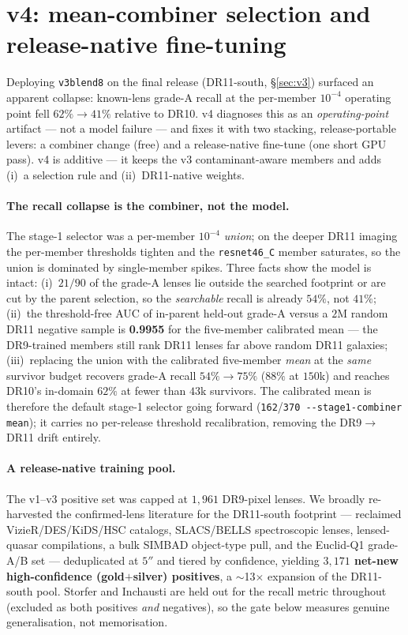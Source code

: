 \section{\cnet{} v4: mean-combiner selection and release-native fine-tuning}
\label{sec:v4}
Deploying \texttt{v3blend8} on the final release (DR11-south, \S\ref{sec:v3}) surfaced an apparent
collapse: known-lens grade-A recall at the per-member $10^{-4}$ operating point fell $62\%\!\to\!41\%$
relative to DR10. v4 diagnoses this as an \emph{operating-point} artifact --- not a model failure ---
and fixes it with two stacking, release-portable levers: a combiner change (free) and a release-native
fine-tune (one short GPU pass). v4 is additive --- it keeps the v3 contaminant-aware members and adds
(i)~a selection rule and (ii)~DR11-native weights.

\paragraph{The recall collapse is the combiner, not the model.} The stage-1 selector was a per-member
$10^{-4}$ \emph{union}; on the deeper DR11 imaging the per-member thresholds tighten and the
\texttt{resnet46\_C} member saturates, so the union is dominated by single-member spikes. Three facts
show the model is intact: (i)~$21/90$ of the grade-A lenses lie outside the searched footprint or are
cut by the parent selection, so the \emph{searchable} recall is already $54\%$, not $41\%$;
(ii)~the threshold-free AUC of in-parent held-out grade-A versus a $2$M random DR11 negative sample is
\textbf{0.9955} for the five-member calibrated mean --- the DR9-trained members still rank DR11 lenses
far above random DR11 galaxies; (iii)~replacing the union with the calibrated five-member \emph{mean}
at the \emph{same} survivor budget recovers grade-A recall $54\%\!\to\!75\%$ ($88\%$ at $150$k) and
reaches DR10's in-domain $62\%$ at fewer than $43$k survivors. The calibrated mean is therefore the
default stage-1 selector going forward (\texttt{162}/\texttt{370 -{}-stage1-combiner mean}); it carries
no per-release threshold recalibration, removing the DR9$\to$DR11 drift entirely.

\paragraph{A release-native training pool.} The v1--v3 positive set was capped at $1{,}961$ DR9-pixel
lenses. We broadly re-harvested the confirmed-lens literature for the DR11-south footprint --- reclaimed
VizieR/DES/KiDS/HSC catalogs, SLACS/BELLS spectroscopic lenses, lensed-quasar compilations, a bulk
SIMBAD object-type pull, and the Euclid-Q1 grade-A/B set --- deduplicated at $5''$ and tiered by
confidence, yielding \textbf{$3{,}171$ net-new high-confidence (gold$+$silver) positives}, a
$\sim$13$\times$ expansion of the DR11-south pool. Storfer and Inchausti are held out for the recall
metric throughout (excluded as both positives \emph{and} negatives), so the gate below measures genuine
generalisation, not memorisation.

